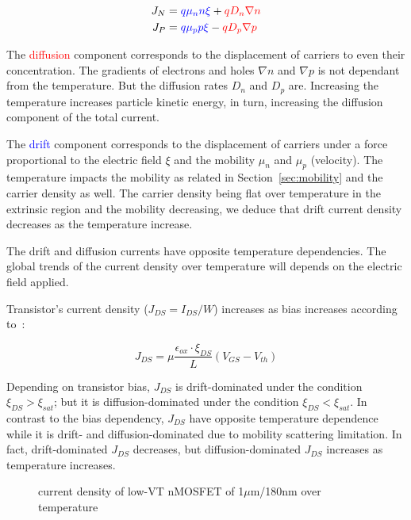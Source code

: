 \begin{align}
\label{eqn:current_density}
J_N &= \textcolor{blue}{q\mu_n n \xi} + \textcolor{red}{qD_n\nabla n} \\
J_P &= \textcolor{blue}{q\mu_p p \xi} - \textcolor{red}{qD_p\nabla p} 
\end{align}

The \textcolor{red}{diffusion} component corresponds to the displacement of carriers to even their concentration. The gradients of electrons and holes \(\nabla n \) and \(\nabla p \) is not dependant from the temperature. But the diffusion rates \(D_n \) and \(D_p \) are. Increasing the temperature increases particle kinetic energy, in turn, increasing the diffusion component of the total current.

The \textcolor{blue}{drift} component corresponds to the displacement of carriers under a force proportional to the electric field \(\xi \) and the mobility \(\mu_n \) and \(\mu_p \) (velocity). The temperature impacts the mobility as related in Section~\ref{sec:mobility} and the carrier density as well. The carrier density being flat over temperature in the extrinsic region and the mobility decreasing, we deduce that drift current density decreases as the temperature increase.

The drift and diffusion currents have opposite temperature dependencies. The global trends of the current density over temperature will depends on the electric field applied.

Transistor's current density (\(J_{DS} = I_{DS}/W\)) increases as bias increases according to~\cite{Sze1981}:

\begin{equation}
J_{DS} = \mu \frac{\epsilon_{ox} \cdot \xi_{DS}}{L} \left(V_{GS}-V_{th}\right)
\label{eqn:JDS}
\end{equation}

Depending on transistor bias, \(J_{DS}\) is drift-dominated under the condition \(\xi_{DS} > \xi_{sat}\); but it is diffusion-dominated under the condition \(\xi_{DS} < \xi_{sat}\). In contrast to the bias dependency, \(J_{DS}\) have opposite temperature dependence while it is drift- and \allowbreak diffusion-dominated due to mobility scattering limitation. In fact, drift-dominated \(J_{DS}\) decreases, but diffusion-dominated \(J_{DS}\) increases as temperature increases.

\begin{figure}[!ht]
    \centering
    
    \caption{current density of low-VT nMOSFET of 1\(\mu \)m/180nm over temperature}
    \label{fig:jds_nel}
\end{figure}

